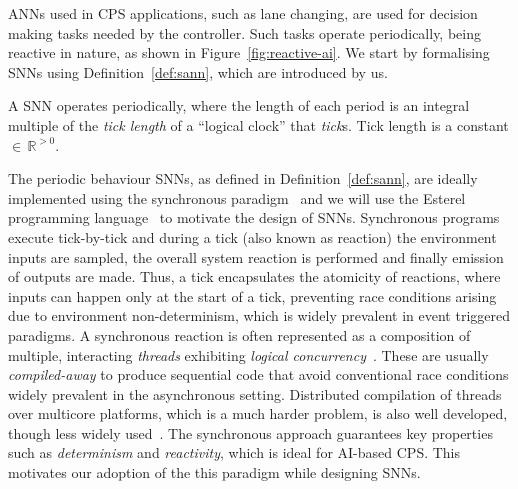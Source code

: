 \acp{ANN} used in \ac{CPS} applications, such as lane changing, are used for decision making tasks 
needed by the controller. Such tasks operate periodically, being reactive in nature,
as shown in Figure~\ref{fig:reactive-ai}. We start by formalising \acp{SNN} using Definition~\ref{def:sann},
which are introduced by us. 

\begin{definition}
	\label{def:sann}
	A \acf{SNN} operates periodically, where the length of each period is 
	an integral multiple of the \emph{tick length} of a ``logical clock'' that \emph{tick}s. Tick length
	is a constant $\in \, \mathbb{R}^{>0}$.
\end{definition}

The periodic behaviour \acp{SNN}, as defined in Definition~\ref{def:sann}, are ideally implemented using the synchronous 
paradigm~\cite{benveniste2003synchronous} and we will use the Esterel programming language~\cite{berry2000foundations} 
to motivate the design of \acp{SNN}. Synchronous programs execute tick-by-tick and during a tick (also known as reaction) the
environment inputs are sampled, the overall system reaction is performed and finally emission of outputs are made. Thus, a tick encapsulates 
the atomicity of reactions, where inputs can happen only at the start of a tick, preventing race conditions arising due to environment 
non-determinism, which is widely prevalent in event triggered paradigms. A synchronous reaction is often represented as a composition of 
multiple, interacting \emph{threads} exhibiting \emph{logical concurrency}~\cite{benveniste2003synchronous}. 
These are usually \emph{compiled-away} to produce sequential code 
that avoid conventional race conditions widely prevalent in the asynchronous setting. Distributed compilation of threads over
multicore platforms, which is a much harder problem, is also well developed, though less widely used~\cite{yuan2011compiling}. The synchronous approach guarantees
key properties such as \emph{determinism} and \emph{reactivity}, which is ideal for AI-based CPS. This motivates 
our adoption of the this paradigm while designing \acp{SNN}.



